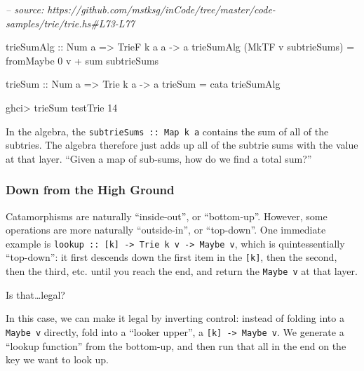 \documentclass[]{article}
\newenvironment{Shaded}{}{}
\newcommand{\CommentTok}[1]{\textcolor[rgb]{0.38,0.63,0.69}{\textit{#1}}}
\newcommand{\DataTypeTok}[1]{\textcolor[rgb]{0.56,0.13,0.00}{#1}}
\newcommand{\DecValTok}[1]{\textcolor[rgb]{0.25,0.63,0.44}{#1}}
\newcommand{\FunctionTok}[1]{\textcolor[rgb]{0.02,0.16,0.49}{#1}}
\newcommand{\NormalTok}[1]{#1}
\newcommand{\OtherTok}[1]{\textcolor[rgb]{0.00,0.44,0.13}{#1}}
\begin{document}
\begin{Shaded}
\begin{Highlighting}[]
\CommentTok{-- source: https://github.com/mstksg/inCode/tree/master/code-samples/trie/trie.hs#L73-L77}

\OtherTok{trieSumAlg ::} \DataTypeTok{Num}\NormalTok{ a }\OtherTok{=>} \DataTypeTok{TrieF}\NormalTok{ k a a }\OtherTok{->}\NormalTok{ a}
\NormalTok{trieSumAlg (}\DataTypeTok{MkTF}\NormalTok{ v subtrieSums) }\FunctionTok{=}\NormalTok{ fromMaybe }\DecValTok{0}\NormalTok{ v }\FunctionTok{+}\NormalTok{ sum subtrieSums}

\OtherTok{trieSum ::} \DataTypeTok{Num}\NormalTok{ a }\OtherTok{=>} \DataTypeTok{Trie}\NormalTok{ k a }\OtherTok{->}\NormalTok{ a}
\NormalTok{trieSum }\FunctionTok{=}\NormalTok{ cata trieSumAlg}
\end{Highlighting}
\end{Shaded}

\begin{Shaded}
\begin{Highlighting}[]
\NormalTok{ghci}\FunctionTok{>}\NormalTok{ trieSum testTrie}
\DecValTok{14}
\end{Highlighting}
\end{Shaded}

In the algebra, the \texttt{subtrieSums\ ::\ Map\ k\ a} contains the sum of all
of the subtries. The algebra therefore just adds up all of the subtrie sums with
the value at that layer. ``Given a map of sub-sums, how do we find a total
sum?''

\hypertarget{down-from-the-high-ground}{%
\subsubsection{Down from the High Ground}\label{down-from-the-high-ground}}

Catamorphisms are naturally ``inside-out'', or ``bottom-up''. However, some
operations are more naturally ``outside-in'', or ``top-down''. One immediate
example is
\texttt{lookup\ ::\ {[}k{]}\ -\textgreater{}\ Trie\ k\ v\ -\textgreater{}\ Maybe\ v},
which is quintessentially ``top-down'': it first descends down the first item in
the \texttt{{[}k{]}}, then the second, then the third, etc. until you reach the
end, and return the \texttt{Maybe\ v} at that layer.

Is that\ldots{}legal?

In this case, we can make it legal by inverting control: instead of folding into
a \texttt{Maybe\ v} directly, fold into a ``looker upper'', a
\texttt{{[}k{]}\ -\textgreater{}\ Maybe\ v}. We generate a ``lookup function''
from the bottom-up, and then run that all in the end on the key we want to look
up.
\end{document}
